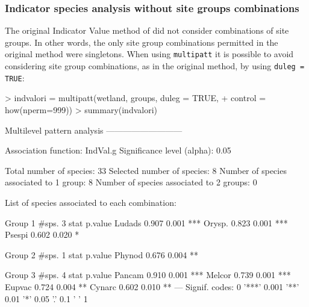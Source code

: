 \documentclass[11pt,a4paper]{article}
\begin{document}
\subsubsection{Indicator species analysis without site groups combinations}
The original Indicator Value method of \citet{Dufrene1997} did not consider combinations of site groups. In other words, the only site group combinations permitted in the original method were singletons. When using \texttt{multipatt} it is possible to avoid considering site group combinations, as in the original method, by using \texttt{duleg = TRUE}:
\begin{Schunk}
\begin{Sinput}
> indvalori = multipatt(wetland, groups, duleg = TRUE, 
+                       control = how(nperm=999)) 
> summary(indvalori)
\end{Sinput}
\begin{Soutput}
 Multilevel pattern analysis
 ---------------------------

 Association function: IndVal.g
 Significance level (alpha): 0.05

 Total number of species: 33
 Selected number of species: 8 
 Number of species associated to 1 group: 8 
 Number of species associated to 2 groups: 0 

 List of species associated to each combination: 

 Group 1  #sps.  3 
        stat p.value    
Ludads 0.907   0.001 ***
Orysp. 0.823   0.001 ***
Psespi 0.602   0.020 *  

 Group 2  #sps.  1 
        stat p.value   
Phynod 0.676   0.004 **

 Group 3  #sps.  4 
        stat p.value    
Pancam 0.910   0.001 ***
Melcor 0.739   0.001 ***
Eupvac 0.724   0.004 ** 
Cynarc 0.602   0.010 ** 
---
Signif. codes:  0 '***' 0.001 '**' 0.01 '*' 0.05 '.' 0.1 ' ' 1 
\end{Soutput}
\end{Schunk}
\end{document}
